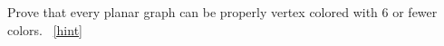 \documentclass{book}
\begin{document}
\setcounter{project}{38}
\addtocounter{project}{-1}
\begin{activity}[]\label{activity-31}
\hypertarget{p-369}{}%
Prove that every planar graph can be properly vertex colored with 6 or fewer colors.%
~\hfill{\tiny\hyperlink{a-38}{[hint]}\hypertarget{q-38}{}}\end{activity}
\end{document}
